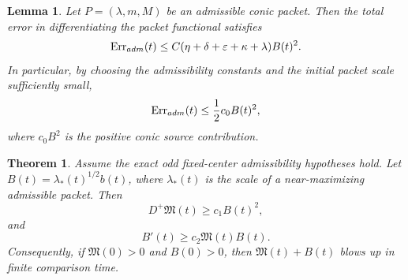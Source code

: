 \documentclass[10pt,a4paper]{amsart}
\newtheorem{lemma}{Lemma}
\newtheorem{theorem}{Theorem}
\begin{document}
\begin{lemma}\label{lem:admissibility_error_closure}
Let \(P=(\lambda,m,M)\) be an admissible conic packet.  Then the total error in differentiating the packet functional satisfies
\begin{equation}\label{eq:Err_adm_bound_final}
\operatorname{Err}_{\rm adm}(t)
\le
C(\eta+\delta+\varepsilon+\kappa+\lambda)B(t)^2.
\end{equation}
In particular, by choosing the admissibility constants and the initial packet scale sufficiently small,
\begin{equation}\label{eq:Err_adm_absorb_final}
\operatorname{Err}_{\rm adm}(t)
\le
\frac12 c_0B(t)^2,
\end{equation}
where \(c_0B^2\) is the positive conic source contribution.
\end{lemma}

\begin{theorem}\label{thm:dini_final}
Assume the exact odd fixed-center admissibility hypotheses hold.  Let \(B(t)=\lambda_*(t)^{1/2}b(t)\), where \(\lambda_*(t)\) is the scale of a near-maximizing admissible packet.  Then
\begin{equation}\label{eq:Dini_final_M}
D^+\mathfrak M(t)
\ge
c_1B(t)^2,
\end{equation}
and
\begin{equation}\label{eq:Dini_final_B}
B'(t)
\ge
c_2\mathfrak M(t)B(t).
\end{equation}
Consequently, if \(\mathfrak M(0)>0\) and \(B(0)>0\), then \(\mathfrak M(t)+B(t)\) blows up in finite comparison time.
\end{theorem}
\end{document}
